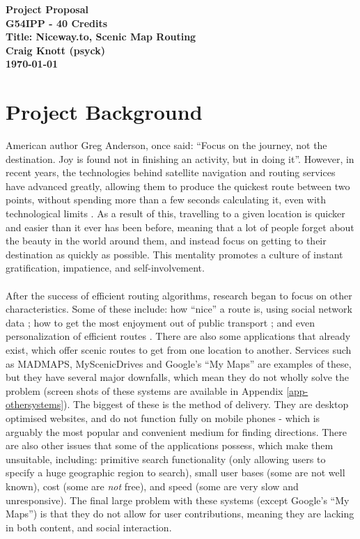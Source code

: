 \documentclass[a4paper,twoside,notitlepage,11pt]{article}
\begin{document}
\pagestyle{empty}
\begin{center}
 {\LARGE \textbf{Project Proposal} \\ [0.1cm]}
 \textbf{G54IPP - 40 Credits}\\
   \textbf{Title: Niceway.to, Scenic Map Routing}\\
    \textbf{Craig Knott (psyck)} \\
	 \textbf{\today}
\end{center}

\section{Project Background}
American author Greg Anderson, once said: ``Focus on the journey, not the destination. Joy is found not in finishing an activity, but in doing it''. However, in recent years, the technologies behind satellite navigation and routing services have advanced greatly, allowing them to produce the quickest route between two points, without spending more than a few seconds calculating it, even with technological limits \cite{lou2009map}. As a result of this, travelling to a given location is quicker and easier than it ever has been before, meaning that a lot of people forget about the beauty in the world around them, and instead focus on getting to their destination as quickly as possible. This mentality promotes a culture of instant gratification, impatience, and self-involvement.
\ \\
\ \\
After the success of efficient routing algorithms, research began to focus on other characteristics. Some of these include: how ``nice'' a route is, using social network data \cite{peregrino2012mapping}\cite{van2011time}; how to get the most enjoyment out of public transport \cite{ludwig2009recommendation}; and even personalization of efficient routes \cite{chen2011discovering}. There are also some applications that already exist, which offer scenic routes to get from one location to another. Services such as MADMAPS\cite{url2015madmaps}, MyScenicDrives\cite{url2015myscenicdrives} and Google's ``My Maps''\cite{url2015gmaps} are examples of these, but they have several major downfalls, which mean they do not wholly solve the problem (screen shots of these systems are available in Appendix \ref{app-othersystems}). The biggest of these is the method of delivery. They are desktop optimised websites, and do not function fully on mobile phones - which is arguably the most popular and convenient medium for finding directions. There are also other issues that some of the applications possess, which make them unsuitable, including: primitive search functionality (only allowing users to specify a huge geographic region to search), small user bases (some are not well known), cost (some are \textit{not} free), and speed (some are very slow and unresponsive). The final large problem with these systems (except Google's ``My Maps'') is that they do not allow for user contributions, meaning they are lacking in both content, and social interaction.
\end{document}
